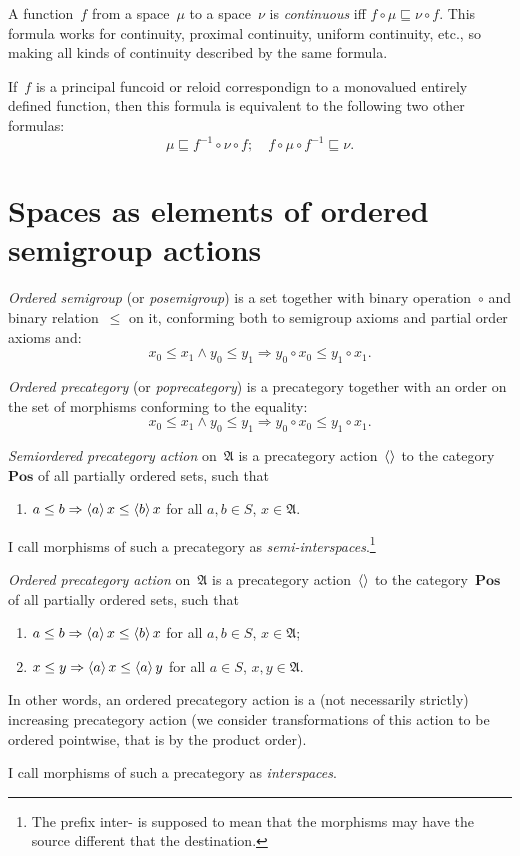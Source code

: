 \documentclass{amsart}
\begin{document}
A function~$f$ from a space~$\mu$ to a space~$\nu$ is \emph{continuous} iff
$f\circ\mu\sqsubseteq \nu\circ f$. This formula works for continuity, proximal continuity,
uniform continuity, etc., so making all kinds of continuity described by the same formula.

If~$f$ is a principal funcoid or reloid correspondign to a monovalued entirely defined function, then this formula is
equivalent to the following two other formulas:
\[ \mu\sqsubseteq f^{-1}\circ\nu\circ f;\quad
f\circ\mu\circ f^{-1}\sqsubseteq \nu. \]

\section{Spaces as elements of ordered semigroup actions}

\begin{defn}
\emph{Ordered semigroup} (or \emph{posemigroup}) is a set together with binary operation~$\circ$ and binary relation~$\leq$ on it, conforming both to semigroup axioms and partial order axioms and:
\[ x_0\leq x_1\land y_0\leq y_1\Rightarrow y_0\circ x_0\leq y_1\circ x_1. \]
\end{defn}

\begin{defn}
\emph{Ordered precategory} (or \emph{poprecategory}) is
a precategory together with an order on the set of morphisms conforming to the equality:
\[ x_0\leq x_1\land y_0\leq y_1\Rightarrow y_0\circ x_0\leq y_1\circ x_1. \]
\end{defn}

\begin{defn}
\emph{Semiordered precategory action} on~$\mathfrak{A}$ is a precategory action~$\left\langle \right\rangle$ to the category~$\mathbf{Pos}$ of all partially ordered sets, such that
\begin{enumerate}
\item $a\leq b\Rightarrow\left\langle a\right\rangle x\leq \left\langle b\right\rangle x$ for all $a,b\in S$, $x\in\mathfrak{A}$.
\end{enumerate}
I call morphisms of such a precategory as \emph{semi-interspaces}.\footnote{The prefix inter- is supposed to mean that the morphisms may have the source different that the destination.}
\end{defn}

\begin{defn}
\emph{Ordered precategory action} on~$\mathfrak{A}$ is a precategory action~$\left\langle \right\rangle$ to the category~$\mathbf{Pos}$ of all partially ordered sets, such that
\begin{enumerate}
\item $a\leq b\Rightarrow\left\langle a\right\rangle x\leq \left\langle b\right\rangle x$ for all $a,b\in S$, $x\in\mathfrak{A}$;
\item $x\leq y\Rightarrow\left\langle a\right\rangle x\leq \left\langle a\right\rangle y$ for all $a\in S$, $x,y\in\mathfrak{A}$.
\end{enumerate}
In other words, an ordered precategory action is a (not necessarily strictly) increasing precategory action (we consider transformations of this action to be ordered pointwise, that is by the product order).

I call morphisms of such a precategory as \emph{interspaces}.
\end{defn}
\end{document}
